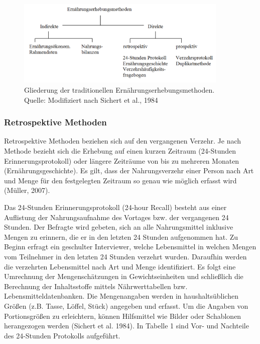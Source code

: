 \begin{figure}[!h]
	\centering
		
	\includegraphics[width=0.9\textwidth]{Bilder/Abb1.png}

	\caption[Gliederung der traditionellen Ernährungserhebungsmethoden]{Gliederung der traditionellen Ernährungserhebungsmethoden.\\ Quelle: Modifiziert nach Sichert et al., 1984}
	\label{bild2}
\end{figure}

\subsubsection{Retrospektive Methoden}

Retrospektive Methoden beziehen sich auf den vergangenen Verzehr. Je nach Methode bezieht sich die Erhebung auf einen kurzen Zeitraum (24-Stunden Erinnerungsprotokoll) oder längere Zeiträume von bis zu mehreren Monaten (Ernährungsgeschichte). Es gilt, dass der Nahrungsverzehr einer Person nach Art und Menge für den festgelegten Zeitraum so genau wie möglich erfasst wird (Müller, 2007).


Das 24-Stunden Erinnerungsprotokoll (24-hour Recall) besteht aus einer Auflistung der Nahrungsaufnahme des Vortages bzw. der vergangenen 24 Stunden. Der Befragte wird gebeten, sich an alle Nahrungsmittel inklusive Mengen zu erinnern, die er in den letzten 24 Stunden aufgenommen hat. Zu Beginn erfragt ein geschulter Interviewer, welche Lebensmittel in welchen Mengen vom Teilnehmer in den letzten 24 Stunden verzehrt wurden. Daraufhin werden die verzehrten Lebensmittel nach Art und Menge identifiziert. Es folgt eine Umrechnung der Mengenschätzungen in Gewichtseinheiten und schließlich die Berechnung der Inhaltsstoffe mittels Nährwerttabellen bzw. Lebensmitteldatenbanken. Die Mengenangaben werden in haushaltsüblichen Größen (z.B. Tasse, Löffel, Stück) angegeben und erfasst. Um die Angaben von Portionsgrößen zu erleichtern, können Hilfsmittel wie Bilder oder Schablonen herangezogen werden (Sichert et al. 1984). In Tabelle 1 sind Vor- und Nachteile des 24-Stunden Protokolls aufgeführt.



